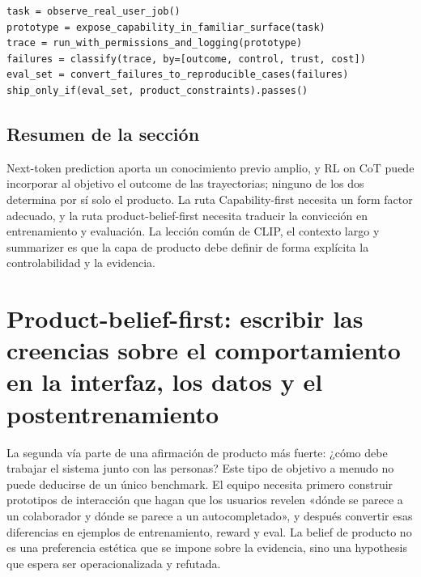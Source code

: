 \documentclass[a4paper]{article}
\begin{document}
\begin{lstlisting}[caption={Ciclo mínimo de validación de un prototipo Capability-first}]
task = observe_real_user_job()
prototype = expose_capability_in_familiar_surface(task)
trace = run_with_permissions_and_logging(prototype)
failures = classify(trace, by=[outcome, control, trust, cost])
eval_set = convert_failures_to_reproducible_cases(failures)
ship_only_if(eval_set, product_constraints).passes()
\end{lstlisting}


\subsection{Resumen de la sección}

Next-token prediction aporta un conocimiento previo amplio, y RL on CoT puede incorporar al objetivo el outcome de las trayectorias; ninguno de los dos determina por sí solo el producto. La ruta Capability-first necesita un form factor adecuado, y la ruta product-belief-first necesita traducir la convicción en entrenamiento y evaluación. La lección común de CLIP, el contexto largo y summarizer es que la capa de producto debe definir de forma explícita la controlabilidad y la evidencia.
\section{Product-belief-first: escribir las creencias sobre el comportamiento en la interfaz, los datos y el postentrenamiento}

La segunda vía parte de una afirmación de producto más fuerte: ¿cómo debe trabajar el sistema junto con las personas? Este tipo de objetivo a menudo no puede deducirse de un único benchmark. El equipo necesita primero construir prototipos de interacción que hagan que los usuarios revelen «dónde se parece a un colaborador y dónde se parece a un autocompletado», y después convertir esas diferencias en ejemplos de entrenamiento, reward y eval. La belief de producto no es una preferencia estética que se impone sobre la evidencia, sino una hypothesis que espera ser operacionalizada y refutada.
\end{document}
